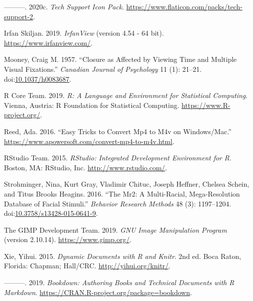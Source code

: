 \documentclass[]{book}
\begin{document}
\hypertarget{ref-techpack}{}
---------. 2020c. \emph{Tech Support Icon Pack}.
\url{https://www.flaticon.com/packs/tech-support-2}.

\hypertarget{ref-irfanview}{}
Irfan Skiljan. 2019. \emph{IrfanView} (version 4.54 - 64 bit).
\url{https://www.irfanview.com/}.

\hypertarget{ref-mooneys}{}
Mooney, Craig M. 1957. ``Closure as Affected by Viewing Time and
Multiple Visual Fixations.'' \emph{Canadian Journal of Psychology} 11
(1): 21--21.
doi:\href{https://doi.org/10.1037/h0083687}{10.1037/h0083687}.

\hypertarget{ref-baser}{}
R Core Team. 2019. \emph{R: A Language and Environment for Statistical
Computing}. Vienna, Austria: R Foundation for Statistical Computing.
\url{https://www.R-project.org/}.

\hypertarget{ref-m4vconv}{}
Reed, Ada. 2016. ``Easy Tricks to Convert Mp4 to M4v on Windows/Mac.''
\url{https://www.apowersoft.com/convert-mp4-to-m4v.html}.

\hypertarget{ref-rstudio}{}
RStudio Team. 2015. \emph{RStudio: Integrated Development Environment
for R}. Boston, MA: RStudio, Inc. \url{http://www.rstudio.com/}.

\hypertarget{ref-mr2}{}
Strohminger, Nina, Kurt Gray, Vladimir Chituc, Joseph Heffner, Chelsea
Schein, and Titus Brooks Heagins. 2016. ``The Mr2: A Multi-Racial,
Mega-Resolution Database of Facial Stimuli.'' \emph{Behavior Research
Methods} 48 (3): 1197--1204.
doi:\href{https://doi.org/10.3758/s13428-015-0641-9}{10.3758/s13428-015-0641-9}.

\hypertarget{ref-gimp}{}
The GIMP Development Team. 2019. \emph{GNU Image Manipulation Program}
(version 2.10.14). \url{https://www.gimp.org/}.

\hypertarget{ref-xie2015}{}
Xie, Yihui. 2015. \emph{Dynamic Documents with R and Knitr}. 2nd ed.
Boca Raton, Florida: Chapman; Hall/CRC. \url{http://yihui.org/knitr/}.

\hypertarget{ref-R-bookdown}{}
---------. 2019. \emph{Bookdown: Authoring Books and Technical Documents
with R Markdown}. \url{https://CRAN.R-project.org/package=bookdown}.
\end{document}
